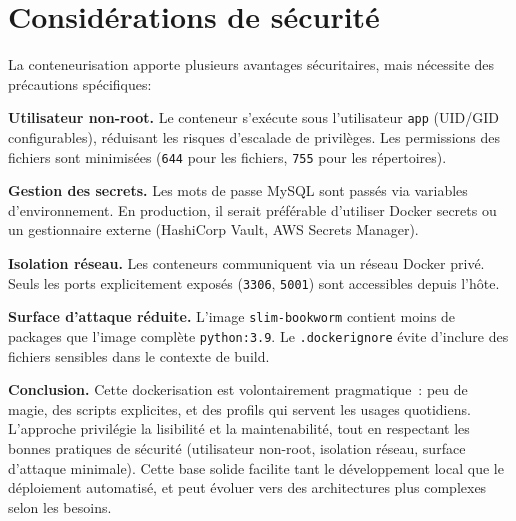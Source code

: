 \section{Considérations de sécurité}

La conteneurisation apporte plusieurs avantages sécuritaires, mais nécessite des précautions spécifiques:

\textbf{Utilisateur non-root.} Le conteneur s'exécute sous l'utilisateur \texttt{app} (UID/GID configurables), réduisant les risques d'escalade de privilèges. Les permissions des fichiers sont minimisées (\texttt{644} pour les fichiers, \texttt{755} pour les répertoires).

\textbf{Gestion des secrets.} Les mots de passe MySQL sont passés via variables d'environnement. En production, il serait préférable d'utiliser Docker secrets ou un gestionnaire externe (HashiCorp Vault, AWS Secrets Manager).

\textbf{Isolation réseau.} Les conteneurs communiquent via un réseau Docker privé. Seuls les ports explicitement exposés (\texttt{3306}, \texttt{5001}) sont accessibles depuis l'hôte.

\textbf{Surface d'attaque réduite.} L'image \texttt{slim-bookworm} contient moins de packages que l'image complète \texttt{python:3.9}. Le \texttt{.dockerignore} évite d'inclure des fichiers sensibles dans le contexte de build.




\noindent\textbf{Conclusion.} Cette dockerisation est volontairement pragmatique : peu de magie, des scripts explicites, et des profils qui servent les usages quotidiens. L'approche privilégie la lisibilité et la maintenabilité, tout en respectant les bonnes pratiques de sécurité (utilisateur non-root, isolation réseau, surface d'attaque minimale). Cette base solide facilite tant le développement local que le déploiement automatisé, et peut évoluer vers des architectures plus complexes selon les besoins.
